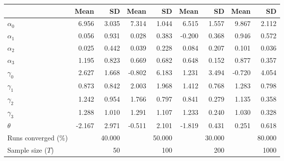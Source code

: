 
\begin{tabular}[t]{lrrrrrrrr}
\toprule
  & Mean & SD & Mean  & SD  & Mean   & SD   & Mean    & SD   \\
\midrule
$\alpha_{0}$ & 6.956 & 3.035 & 7.314 & 1.044 & 6.515 & 1.557 & 9.867 & 2.112\\
$\alpha_{1}$ & 0.056 & 0.931 & 0.028 & 0.383 & -0.200 & 0.368 & 0.946 & 0.572\\
$\alpha_{2}$ & 0.025 & 0.442 & 0.039 & 0.228 & 0.084 & 0.207 & 0.101 & 0.036\\
$\alpha_{3}$ & 1.195 & 0.823 & 0.669 & 0.682 & 0.648 & 0.152 & 0.877 & 0.357\\
$\gamma_{0}$ & 2.627 & 1.668 & -0.802 & 6.183 & 1.231 & 3.494 & -0.720 & 4.054\\
$\gamma_{1}$ & 0.873 & 0.842 & 2.003 & 1.968 & 1.412 & 0.768 & 1.283 & 0.798\\
$\gamma_{2}$ & 1.242 & 0.954 & 1.766 & 0.797 & 0.841 & 0.279 & 1.135 & 0.358\\
$\gamma_{3}$ & 1.288 & 1.010 & 1.291 & 1.107 & 1.233 & 0.240 & 1.030 & 0.328\\
$\theta$ & -2.167 & 2.971 & -0.511 & 2.101 & -1.819 & 0.431 & 0.251 & 0.618\\
Runs converged (\%) &  & 40.000 &  & 50.000 &  & 30.000 &  & 80.000\\
Sample size ($T$) &  & 50 &  & 100 &  & 200 &  & 1000\\
\bottomrule
\end{tabular}
